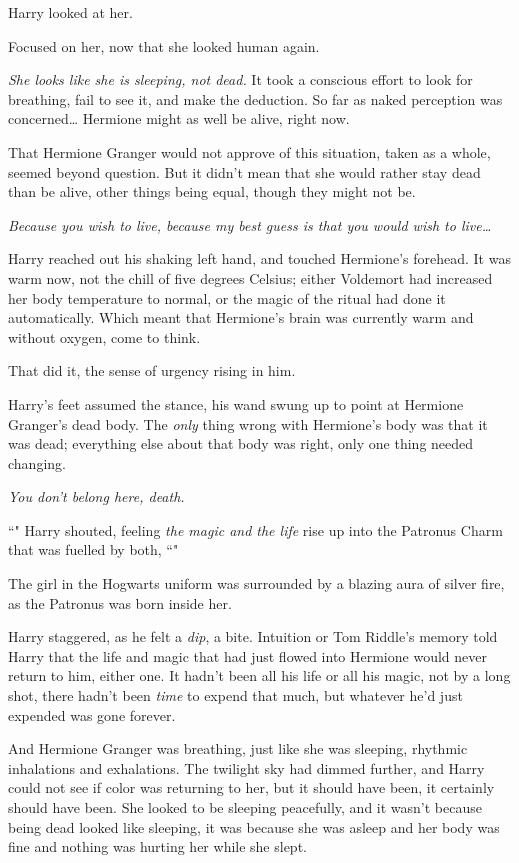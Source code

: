 Harry looked at her.

Focused on her, now that she looked human again.

\emph{She looks like she is sleeping, not dead.} It took a conscious effort to look for breathing, fail to see it, and make the deduction. So far as naked perception was concerned{\ldots} Hermione might as well be alive, right now.

That Hermione Granger would not approve of this situation, taken as a whole, seemed beyond question. But it didn't mean that she would rather stay dead than be alive, other things being equal, though they might not be.

\emph{Because you wish to live, because my best guess is that you would wish to live{\ldots}}

Harry reached out his shaking left hand, and touched Hermione's forehead. It was warm now, not the chill of five degrees Celsius; either Voldemort had increased her body temperature to normal, or the magic of the ritual had done it automatically. Which meant that Hermione's brain was currently warm and without oxygen, come to think.

That did it, the sense of urgency rising in him.

Harry's feet assumed the stance, his wand swung up to point at Hermione Granger's dead body. The \emph{only} thing wrong with Hermione's body was that it was dead; everything else about that body was right, only one thing needed changing.

\emph{You don't belong here, death.}

``" Harry shouted, feeling \emph{the magic and the life} rise up into the Patronus Charm that was fuelled by both, ``"

The girl in the Hogwarts uniform was surrounded by a blazing aura of silver fire, as the Patronus was born inside her.

Harry staggered, as he felt a \emph{dip}, a bite. Intuition or Tom Riddle's memory told Harry that the life and magic that had just flowed into Hermione would never return to him, either one. It hadn't been all his life or all his magic, not by a long shot, there hadn't been \emph{time} to expend that much, but whatever he'd just expended was gone forever.

And Hermione Granger was breathing, just like she was sleeping, rhythmic inhalations and exhalations. The twilight sky had dimmed further, and Harry could not see if color was returning to her, but it should have been, it certainly should have been. She looked to be sleeping peacefully, and it wasn't because being dead looked like sleeping, it was because she was asleep and her body was fine and nothing was hurting her while she slept.

